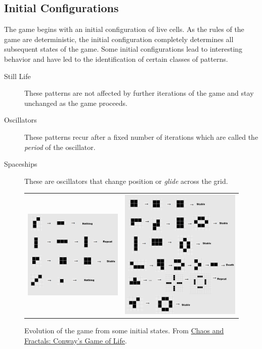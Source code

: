 \documentclass[addpoints]{exam}
\begin{document}
\subsection{Initial Configurations}

The game begins with an initial configuration of live cells. As the rules of the game are deterministic, the initial configuration completely determines all subsequent states of the game. Some initial configurations lead to interesting behavior and have led to the identification of certain classes of patterns.
\begin{description}
\item[Still Life] These patterns are not affected by further iterations of the game and stay unchanged as the game proceeds.
\item[Oscillators] These patterns recur after a fixed number of iterations which are called the \textit{period} of the oscillator.
\item[Spaceships] These are oscillators that change position or \textit{glide} across the grid.
\end{description}

\begin{figure}[!h]
  \centering
  \begin{tabular}{cc}
    \includegraphics[width=.48\textwidth]{pattern1}
    & \includegraphics[width=.48\textwidth]{pattern2}
  \end{tabular}
  \caption{Evolution of the game from some initial states. From \href{http://pi.math.cornell.edu/~lipa/mec/lesson6.html}{Chaos and Fractals: Conway's Game of Life}.}
\end{figure}
\end{document}
